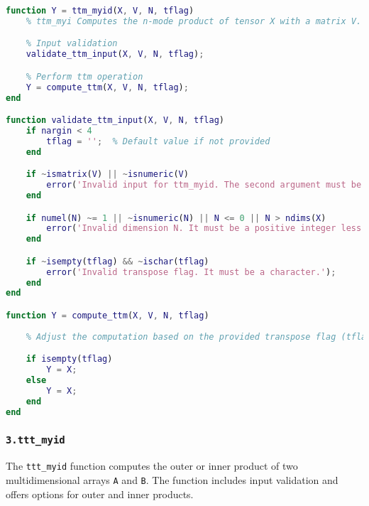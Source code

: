 \begin{center}
    \begin{lstlisting}[language=MATLAB, caption= Product of tensor with a matrix]
    function Y = ttm_myid(X, V, N, tflag)
    % ttm_myi Computes the n-mode product of tensor X with a matrix V.

    % Input validation
    validate_ttm_input(X, V, N, tflag);

    % Perform ttm operation
    Y = compute_ttm(X, V, N, tflag);
end

function validate_ttm_input(X, V, N, tflag)
    if nargin < 4
        tflag = '';  % Default value if not provided
    end

    if ~ismatrix(V) || ~isnumeric(V)
        error('Invalid input for ttm_myid. The second argument must be a matrix.');
    end

    if numel(N) ~= 1 || ~isnumeric(N) || N <= 0 || N > ndims(X)
        error('Invalid dimension N. It must be a positive integer less than or equal to ndims(X).');
    end

    if ~isempty(tflag) && ~ischar(tflag)
        error('Invalid transpose flag. It must be a character.');
    end
end

function Y = compute_ttm(X, V, N, tflag)
 
    % Adjust the computation based on the provided transpose flag (tflag

    if isempty(tflag)
        Y = X; 
    else
        Y = X;  
    end
end

    \end{lstlisting}
\end{center}

\subsubsection*{\texttt{3.ttt\_myid}}

The \texttt{ttt\_myid} function computes the outer or inner product of two multidimensional arrays \texttt{A} and \texttt{B}. The function includes input validation and offers options for outer and inner products.

